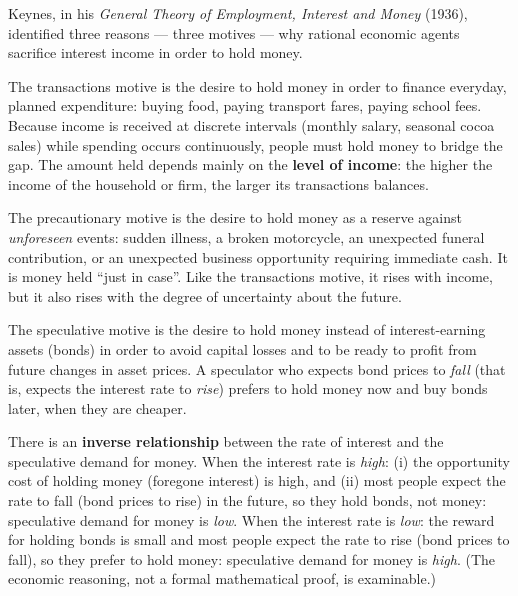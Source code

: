 \documentclass[11pt]{article}
\newcommand{\cle}[1]{{\popxbold\color{popdark}#1}}
\newcounter{popsec}
\newcounter{popsub}
\newcommand{\courssub}[1]{%
  \stepcounter{popsub}%
  \par\vspace{9pt}\noindent{\popxbold\fontsize{11.5}{13}\selectfont\color{popink}{\color{poporange}\thepopsec.\thepopsub}\hspace{6pt}#1}\par\nopagebreak\vspace{4pt}
}
\begin{document}
\courssub{Keynes's Motives for Holding Money}

Keynes, in his \emph{General Theory of Employment, Interest and Money} (1936), identified three reasons --- three \cle{motives} --- why rational economic agents sacrifice interest income in order to hold money.

\begin{definition}
The \cle{transactions motive} is the desire to hold money in order to finance everyday, planned expenditure: buying food, paying transport fares, paying school fees. Because income is received at discrete intervals (monthly salary, seasonal cocoa sales) while spending occurs continuously, people must hold money to bridge the gap. The amount held depends mainly on the \textbf{level of income}: the higher the income of the household or firm, the larger its transactions balances.
\end{definition}

\begin{definition}
The \cle{precautionary motive} is the desire to hold money as a reserve against \emph{unforeseen} events: sudden illness, a broken motorcycle, an unexpected funeral contribution, or an unexpected business opportunity requiring immediate cash. It is money held ``just in case''. Like the transactions motive, it rises with income, but it also rises with the degree of uncertainty about the future.
\end{definition}

\begin{definition}
The \cle{speculative motive} is the desire to hold money instead of interest-earning assets (bonds) in order to avoid capital losses and to be ready to profit from future changes in asset prices. A speculator who expects bond prices to \emph{fall} (that is, expects the interest rate to \emph{rise}) prefers to hold money now and buy bonds later, when they are cheaper.
\end{definition}

\begin{propriete}
There is an \textbf{inverse relationship} between the rate of interest and the speculative demand for money. When the interest rate is \emph{high}: (i) the opportunity cost of holding money (foregone interest) is high, and (ii) most people expect the rate to fall (bond prices to rise) in the future, so they hold bonds, not money: speculative demand for money is \emph{low}. When the interest rate is \emph{low}: the reward for holding bonds is small and most people expect the rate to rise (bond prices to fall), so they prefer to hold money: speculative demand for money is \emph{high}. (The economic reasoning, not a formal mathematical proof, is examinable.)
\end{propriete}
\end{document}
